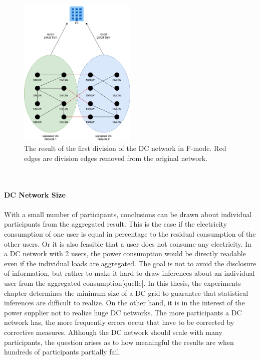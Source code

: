 \begin{figure}[tbp]
  \centering
  \includegraphics[width=0.5\textwidth]{images/DC Net Split.png}
  \caption[DC Network Splitting Algorithm]{The result of the first division of the DC network in F-mode. Red edges are division edges removed from the original network.}
  \label{fig:FirstSplitting}
\end{figure}
\\
\\
\textbf{DC Network Size}
\\
\\
With a small number of participants, conclusions can be drawn about individual participants from the aggregated result. This is the case if the electricity consumption of one user is equal in percentage to the residual consumption of the other users. Or it is also feasible that a user does not consume any electricity. In a DC network with 2 users, the power consumption would be directly readable even if the individual loads are aggregated. The goal is not to avoid the disclosure of information, but rather to make it hard to draw inferences about an individual user from the aggregated consumption[quelle].
In this thesis, the experiments chapter determines the minimum size of a DC grid to guarantee that statistical inferences are difficult to realize.
On the other hand, it is in the interest of the power supplier not to realize huge DC networks. The more participants a DC network has, the more frequently errors occur that have to be corrected by corrective measures. Although the DC network should scale with many participants, the question arises as to how meaningful the results are when hundreds of participants partially fail.%


